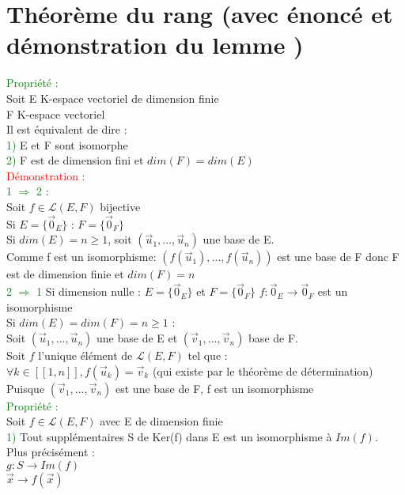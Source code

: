 \documentclass{article}
\begin{document}
\section{Théorème du rang (avec énoncé et démonstration du lemme )}
\textcolor{green}{Propriété :} \\
Soit E K-espace vectoriel de dimension finie \\
F K-espace vectoriel \\
Il est équivalent de dire : \\
\textcolor{green}{1)} E et F sont isomorphe \\
\textcolor{green}{2)} F est de dimension fini et $dim(F)=dim(E)$ \\
\textcolor{red}{Démonstration :} \\
\textcolor{green}{ 1 $\Rightarrow$ 2} : \\
Soit $f \in \mathcal L (E,F)$ bijective \\
Si $E= \lbrace \vec 0_E \rbrace$ : $F=\lbrace \vec 0_F \rbrace$ \\
Si $dim(E)=n \geq 1$, soit $(\vec u_1,..., \vec u_n)$ une base de E. \\
Comme f est un isomorphisme: $(f(\vec u_1),...,f(\vec u_n))$ est une base de F donc F est de dimension finie et $dim(F)=n$ \\
\textcolor{green}{2 $\Rightarrow$ 1} Si dimension nulle : $E=\lbrace  \vec 0_E \rbrace$ et $F=\lbrace \vec 0_F \rbrace$ $f: \vec 0_E \rightarrow \vec 0_F$ est un isomorphisme\\  Si $dim(E)=dim(F)=n \geq 1$ : \\
Soit $(\vec u_1,..., \vec u_n)$ une base de E et $(\vec v_1,..., \vec v_n)$ base de F. \\
Soit $f$ l'unique élément de $\mathcal L (E,F)$ tel que : \\
$\forall k \in [[1,n]],f(\vec u_k)=\vec v_k$ (qui existe par le théorème de détermination) \\
Puisque $(\vec v_1,..., \vec v_n)$ est une base de F, f est un isomorphisme \\
\textcolor{green}{Propriété :} \\
Soit $f \in \mathcal L (E,F)$ avec E de dimension finie \\
\textcolor{green}{1)} Tout supplémentaires S de Ker(f) dans E est un isomorphisme à $Im(f)$. \\
Plus précisément : \\
$g: S \rightarrow Im(f)$ \\
$ \vec x \rightarrow f(\vec x)$ \\
\end{document}
